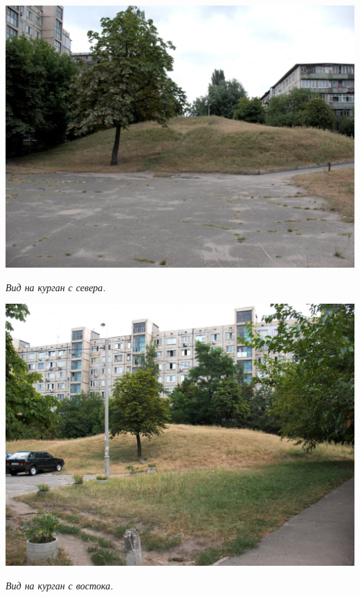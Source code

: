 \begin{center}
\includegraphics[width=\linewidth]{chast-gorodki/kurgany/s_CRW_3890.jpg}

\textit{Вид на курган с севера.}
\end{center}


\begin{center}
\includegraphics[width=\linewidth]{chast-gorodki/kurgany/s_CRW_3892.jpg}

\textit{Вид на курган с востока.}
\end{center}


